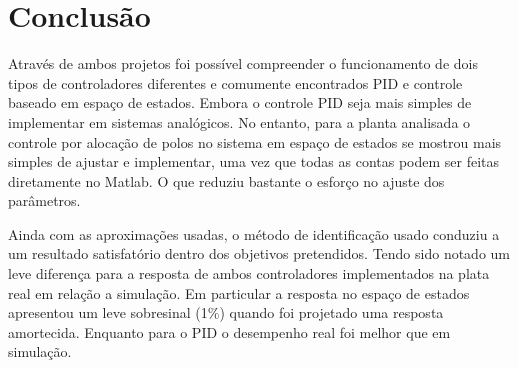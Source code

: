 \documentclass[a4paper,11pt]{article}
\begin{document}

\section{Conclusão}

Através de ambos projetos foi possível compreender o funcionamento de dois tipos de controladores diferentes e comumente encontrados PID e controle baseado em espaço de estados. Embora o controle PID seja mais simples de implementar em sistemas analógicos. No entanto, para a planta analisada o controle por alocação de polos no sistema em espaço de estados se mostrou mais simples de ajustar e implementar, uma vez que todas as contas podem ser feitas diretamente no Matlab. O que reduziu bastante o esforço no ajuste dos parâmetros.

Ainda com as aproximações usadas, o método de identificação usado conduziu a um resultado satisfatório dentro dos objetivos pretendidos. Tendo sido notado um leve diferença para a resposta de ambos controladores implementados na plata real em relação a simulação. Em particular a resposta no espaço de estados apresentou um leve sobresinal (1\%) quando foi projetado uma resposta amortecida. Enquanto para o PID o desempenho real foi melhor que em simulação.





\nocite{ogata2010modern}

\end{document}
